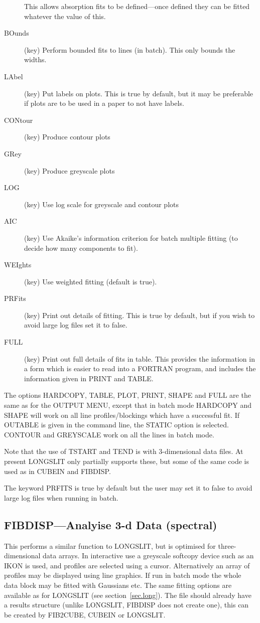 \begin{description}
This allows absorption fits to be defined---once defined they can be
fitted whatever the value of this.
\item[BOunds] (key) Perform bounded fits to lines (in batch).
This only bounds the widths.
\item[LAbel] (key) Put labels on plots.
This is true by default, but it may be preferable if plots are to be
used in a paper to not have labels.
\item[CONtour] (key) Produce contour plots
\item[GRey] (key) Produce greyscale plots
\item[LOG] (key) Use log scale for greyscale and contour plots
\item[AIC] (key) Use Akaike's information criterion for batch
multiple fitting (to decide how many components to fit).
\item[WEIghts] (key) Use weighted fitting (default is true).
\item[PRFits] (key) Print out details of fitting.
This is true by default, but if you wish to avoid large log files set it
to false.
\item[FULL] (key) Print out full details of fits in table.
This provides the information in a form which is easier to read into a
FORTRAN program, and includes the information given in PRINT and TABLE.
\end{description}
The options HARDCOPY, TABLE, PLOT, PRINT, SHAPE and FULL are the same
as for the OUTPUT MENU, except that in batch mode HARDCOPY and SHAPE
will work on all line profiles/blockings which have a successful fit.
If OUTABLE is given in the command line, the STATIC option is
selected.
CONTOUR and GREYSCALE work on all the lines in batch mode.

Note that the use of TSTART and TEND is with 3-dimensional data files.
At present LONGSLIT only partially supports these, but some of the same
code is used as in CUBEIN and FIBDISP.

The keyword PRFITS is true by default but the user may set it to false
to avoid large log files when running in batch.


\subsection{FIBDISP---Analyise 3-d Data (spectral)}

This performs a similar function to LONGSLIT, but is optimised for
three-dimensional data arrays.
In interactive use a greyscale softcopy device such as an IKON is used,
and profiles are selected using a cursor.
Alternatively an
array of profiles may be displayed using line graphics. If run in batch
mode the whole data block may be fitted with Gaussians etc. The same
fitting options are available as for LONGSLIT (see
section~\ref{sec.long}). The file should already have a results
structure (unlike LONGSLIT, FIBDISP does not create one), this can be
created by FIB2CUBE, CUBEIN or LONGSLIT.

